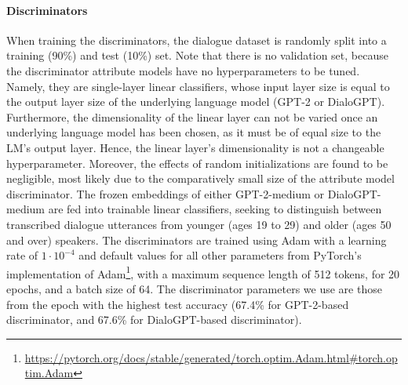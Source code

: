 \paragraph{Discriminators} When training the discriminators, the dialogue dataset is randomly split into a training (90\%) and test (10\%) set. 
Note that there is no validation set, because the discriminator attribute models have no hyperparameters to be tuned. Namely, they are single-layer linear classifiers, whose input layer size is equal to the output layer size of the underlying language model (GPT-2 or DialoGPT). Furthermore, the dimensionality of the linear layer can not be varied once an underlying language model has been chosen, as it must be of equal size to the LM's output layer. Hence, the linear layer's dimensionality is not a changeable hyperparameter. Moreover, the effects of random initializations are found to be negligible, most likely due to the comparatively small size of the attribute model discriminator.
The frozen embeddings of either GPT-2-medium \citep{radford2019language} or DialoGPT-medium \citep{zhang2019dialogpt} are fed into trainable linear classifiers, seeking to distinguish between transcribed dialogue utterances from younger (ages 19 to 29) and older (ages 50 and over) speakers. The discriminators are trained using Adam \citep{DBLP:journals/corr/KingmaB14} with a learning rate of $1\cdot10^{-4}$ 
and default values for all other parameters from PyTorch's implementation of Adam\footnote{\url{https://pytorch.org/docs/stable/generated/torch.optim.Adam.html\#torch.optim.Adam}}, 
with a maximum sequence length of 512 tokens, for 20 epochs, and a batch size of 64. The discriminator parameters we use are those from the epoch with the highest test accuracy (67.4\% for GPT-2-based discriminator, and 67.6\% for DialoGPT-based discriminator). 



